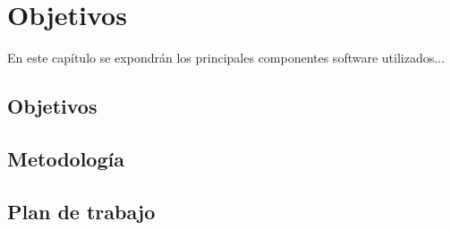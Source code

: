 \chapter{Objetivos}\label{cap.objetivos}
En este capítulo se expondrán los principales componentes software utilizados...

\section{Objetivos}

\section{Metodología}

\section{Plan de trabajo}
